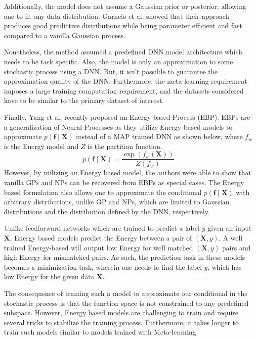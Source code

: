 \documentclass[letterpaper,11pt]{extarticle}
\begin{document}
Additionally, the model does not assume a Gaussian prior or posterior, allowing one to fit any data distribution. Garnelo et al. showed that their approach produces good predictive distributions while being parameter efficient and fast compared to a vanilla Gaussian process.

Nonetheless, the method assumed a predefined DNN model architecture which needs to be task specific. Also, the model is only an approximation to some stochastic process using a DNN. But, it isn't possible to guarantee the approximation quality of the DNN. Furthermore, the meta-learning requirement imposes a large training computation requirement, and the datasets considered have to be similar to the primary dataset of interest. 

Finally, Yang et al.\cite{YangDDS20} recently proposed an Energy-based Process (EBP). EBPs are a generalization of Neural Processes as they utilize Energy-based models \cite{lecunCHRH06} to approximate $p(\mathbf{f} \mid \mathbf{X})$ instead of a MAP trained DNN as shown below, where $f_w$ is the Energy model and $Z$ is the partition function. 
$$
p(\mathbf{f} \mid \mathbf{X}) = \frac{\exp (f_w(\mathbf{X}))}{Z(f_w)}
$$
However, by utilizing an Energy based model, the authors were able to show that vanilla GPs and NPs can be recovered from EBPs as special cases. The Energy based formulation also allows one to approximate the conditional $p(\mathbf{f} \mid \mathbf{X})$ with arbitrary distributions, unlike GP and NPs, which are limited to Gaussian distributions and the distribution defined by the DNN, respectively. 

Unlike feedforward networks which are trained to predict a label $y$ given an input  $\mathbf{X}$, Energy based models predict the Energy between a pair of $(\mathbf{X}, y)$. A well trained Energy-based will output low Energy for well matched $(\mathbf{X}, y)$ pairs and high Energy for mismatched pairs. As such, the prediction task in these models becomes a minimization task, wherein one needs to find the label $y$, which has low Energy for the given data $\mathbf{X}$. 

The consequence of training such a model to approximate our conditional in the stochastic process is that the function space is not constrained to any predefined subspace. However, Energy based models are challenging to train and require several tricks to stabilize the training process. Furthermore, it takes longer to train such models similar to models trained with Meta-learning. 
\end{document}
